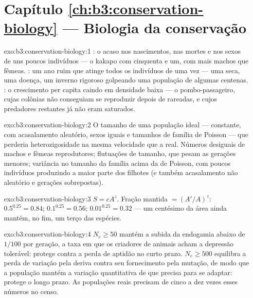 \section*{Capítulo \ref{ch:b3:conservation-biology} --- Biologia da conservação}

\begin{solution}{exo:b3:conservation-biology:1}
: o acaso nos nascimentos, nas mortes e nos
sexos de uns poucos indivíduos --- o kakapo com cinquenta e um, com mais
machos que fêmeas. : um ano ruim que atinge
todos os indivíduos de uma vez --- uma seca, uma doença, um inverno
rigoroso golpeando uma população de algumas centenas. : o
crescimento per capita caindo em densidade baixa --- o pombo-passageiro,
cujas colônias não conseguiam se reproduzir depois de rareadas, e cujos
predadores restantes já não eram saturados.
\end{solution}

\begin{solution}{exo:b3:conservation-biology:2}
O tamanho de uma população ideal --- constante, com acasalamento
aleatório, sexos iguais e tamanhos de família de Poisson --- que perderia
heterozigosidade na mesma velocidade que a real. Números desiguais de
machos e fêmeas reprodutores; flutuações de tamanho, que pesam as
gerações menores; variância no tamanho da família acima da de Poisson,
com poucos indivíduos produzindo a maior parte dos filhotes (e também
acasalamento não aleatório e gerações sobrepostas).
\end{solution}

\begin{solution}{exo:b3:conservation-biology:3}
$S = cA^{z}$. Fração mantida $= (A'/A)^{z}$: $0.5^{0.25} = 0.84$;
$0.1^{0.25} = 0.56$; $0.01^{0.25} = 0.32$ --- um centésimo da área ainda
mantém, no fim, um terço das espécies.
\end{solution}

\begin{solution}{exo:b3:conservation-biology:4}
$N_{e} \ge 50$ mantém a subida da endogamia abaixo de $1/100$ por
geração, a taxa em que os criadores de animais acham a depressão
tolerável: protege contra a perda de aptidão no curto prazo. $N_{e} \ge
500$ equilibra a perda de variação pela deriva contra seu fornecimento
pela mutação, de modo que a população mantém a variação quantitativa de
que precisa para se adaptar: protege o longo prazo. As populações reais
precisam de cinco a dez vezes esses números no censo.
\end{solution}

